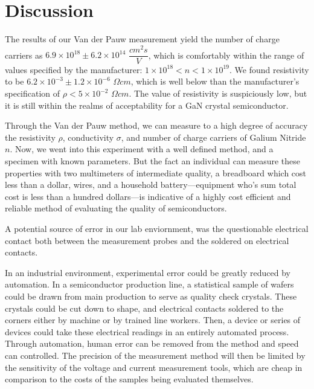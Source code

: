 \section{Discussion}
	The results of our Van der Pauw measurement yield the number of charge carriers as $6.9 \times 10^{18} \pm 6.2 \times 10^{14}$ $\dfrac{cm^2 s}{V}$, which is comfortably within the range of values specified by the manufacturer: $1 \times 10^{18} < n < 1 \times 10^{19}$. We found resistivity to be $6.2 \times 10^{-3} \pm 1.2 \times 10^{-6}$ $\Omega cm$, which is well below than the manufacturer’s specification of $\rho < 5 \times 10^{-2}$  $\Omega cm$. The value of resistivity is suspiciously low, but it is still within the realms of acceptability for a GaN crystal semiconductor.

	Through the Van der Pauw method, we can measure to a high degree of accuracy the resistivity $\rho$, conductivity $\sigma$, and number of charge carriers of Galium Nitride $n$. Now, we went into this experiment with a well defined method, and a specimen with known parameters. But the fact an individual can measure these properties with two multimeters of intermediate quality, a breadboard which cost less than a dollar, wires, and a household battery—equipment who’s sum total cost is less than a hundred dollars—is indicative of a highly cost efficient and reliable method of evaluating the quality of semiconductors.

	A potential source of error in our lab enviornment, was the questionable electrical contact both between the measurement probes and the soldered on electrical contacts.

	In an industrial environment, experimental error could be greatly reduced by automation. In a semiconductor production line, a statistical sample of wafers could be drawn from main production to serve as quality check crystals. These crystals could be cut down to shape, and electrical contacts soldered to the corners either by machine or by trained line workers. Then, a device or series of devices could take these electrical readings in an entirely automated process. Through automation, human error can be removed from the method and speed can controlled. The precision of the measurement method will then be limited by the sensitivity of the voltage and current measurement tools, which are cheap in comparison to the costs of the samples being evaluated themselves.